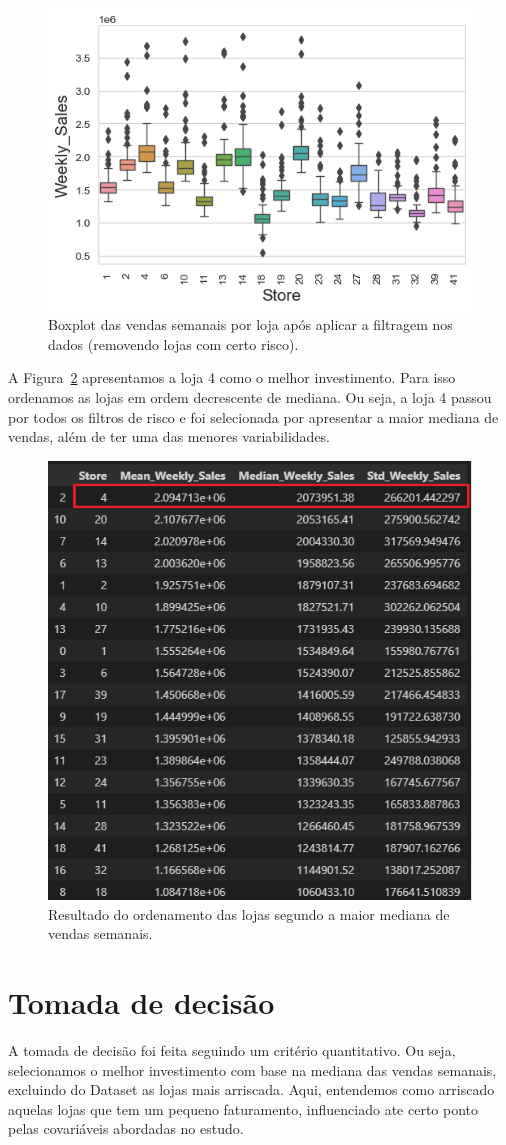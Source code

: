 \documentclass[letterpaper,11pt]{article}
\begin{document}
\begin{figure}[!htb] 
        \centering \includegraphics[width=0.5\columnwidth]{boxplotfinal.png}
        \caption{\label{fig223}Boxplot das vendas semanais por loja após aplicar a filtragem nos dados (removendo lojas com certo risco).
        }
\end{figure}

A Figura~\ref{fig224} apresentamos a loja 4 como o melhor investimento. Para isso ordenamos as lojas em ordem decrescente de mediana. Ou seja, a loja 4 passou por todos os filtros de risco e foi selecionada por apresentar a maior mediana de vendas, além de ter uma das menores variabilidades.

\begin{figure}[!htb] 
        \centering \includegraphics[width=0.5\columnwidth]{metrica.png}
        \caption{\label{fig224}Resultado do ordenamento das lojas segundo a maior mediana de vendas semanais.
        }
\end{figure}

\section{Tomada de decisão}

A tomada de decisão foi feita seguindo um critério quantitativo. Ou seja, selecionamos o melhor investimento com base na mediana das vendas semanais, excluindo do Dataset as lojas mais arriscada. Aqui, entendemos como arriscado aquelas lojas que tem um pequeno faturamento, influenciado ate certo ponto pelas covariáveis abordadas no estudo.
\end{document}
